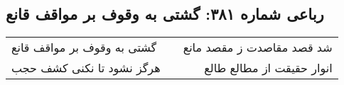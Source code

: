 \begin{center}
\section*{رباعی شماره ۳۸۱: گشتی به وقوف بر مواقف قانع}
\label{sec:sh381}
\begin{longtable}{l p{0.5cm} r}
گشتی به وقوف بر مواقف قانع
&&
شد قصد مقاصدت ز مقصد مانع
\\
هرگز نشود تا نکنی کشف حجب
&&
انوار حقیقت از مطالع طالع
\\
\end{longtable}
\end{center}
